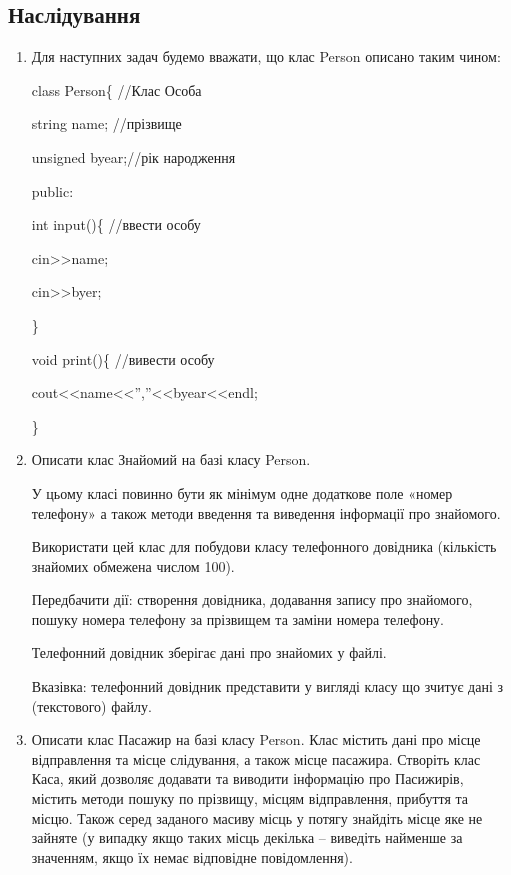 \documentclass[]{article}
\begin{document}
\subsection{Наслідування}
\begin{enumerate}
\item

Для наступних задач будемо вважати, що клас Person описано таким чином:

class Person\{ //Клас Особа

string name; //прізвище

unsigned byear;//рік народження

public:

int input()\{ //ввести особу

cin\textgreater{}\textgreater{}name;

cin\textgreater{}\textgreater{}byer;

\}

void print()\{ //вивести особу

cout\textless{}\textless{}name\textless{}\textless{}'',''\textless{}\textless{}byear\textless{}\textless{}endl;

\}

\item
Описати клас Знайомий на базі класу Person.

У цьому класі повинно бути як мінімум одне додаткове поле «номер
телефону» а також методи введення та виведення інформації про знайомого.

Використати цей клас для побудови класу телефонного довідника (кількість
знайомих обмежена числом 100).

Передбачити дії: створення довідника, додавання запису про знайомого,
пошуку номера телефону за прізвищем та заміни номера телефону.

Телефонний довідник зберігає дані про знайомих у файлі.

Вказівка: телефонний довідник представити у вигляді класу що зчитує дані
з (текстового) файлу.

\item

Описати клас Пасажир на базі класу Person. Клас містить дані про місце
відправлення та місце слідування, а також місце пасажира. Створіть клас
Каса, який дозволяє додавати та виводити інформацію про Пасижирів,
містить методи пошуку по прізвищу, місцям відправлення, прибуття та
місцю. Також серед заданого масиву місць у потягу знайдіть місце яке не
зайняте (у випадку якщо таких місць декілька -- виведіть найменше за
значенням, якщо їх немає відповідне повідомлення).


\end{enumerate}
\end{document}
